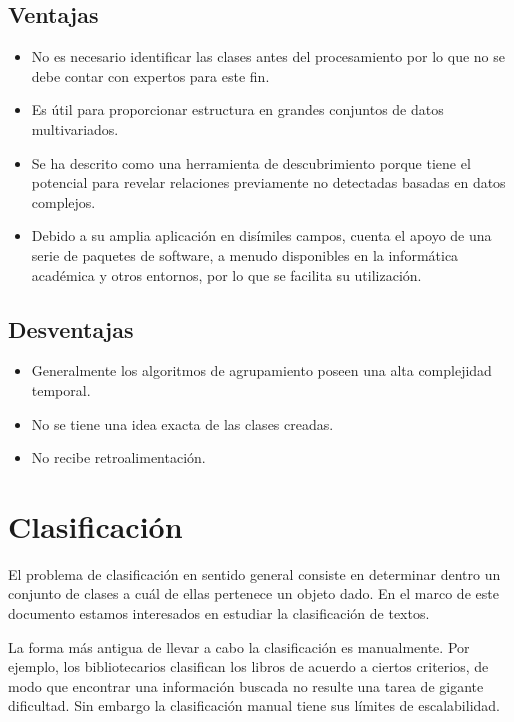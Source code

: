 \documentclass{llncs}
\begin{document}
\subsection{Ventajas} 

\begin{itemize}
	\item No es necesario identificar las clases antes del procesamiento por lo que no se debe contar con expertos para este fin.
	
	\item Es útil para proporcionar estructura en grandes conjuntos de datos multivariados.
	
	\item Se ha descrito como una herramienta de descubrimiento porque tiene el potencial para revelar relaciones previamente no detectadas basadas en datos complejos.
	
	\item Debido a su amplia aplicación en dis\'imiles campos, cuenta el apoyo de una serie de paquetes de software, a menudo disponibles en la informática académica y otros entornos, por lo que se facilita su utilizaci\'on.
\end{itemize}

\subsection{Desventajas} 
	\begin{itemize}
		\item Generalmente los algoritmos de agrupamiento poseen una alta complejidad temporal. 
		\item No se tiene una idea exacta de las clases creadas.
		\item No recibe retroalimentaci\'on.
		
	\end{itemize}
\section{Clasificaci\'on}

	El problema de clasificaci\'on en sentido general consiste en determinar dentro un conjunto de clases a cu\'al de ellas pertenece un objeto dado. En el marco de este documento estamos interesados en estudiar la clasificaci\'on de textos. 
	
%	
	La forma m\'as antigua de llevar a cabo la clasificaci\'on es manualmente. Por ejemplo, los bibliotecarios clasifican los libros de acuerdo a ciertos criterios, de modo que encontrar una informaci\'on buscada no resulte una tarea de gigante dificultad. Sin embargo la clasificaci\'on manual tiene sus l\'imites de escalabilidad. 
	
\end{document}

